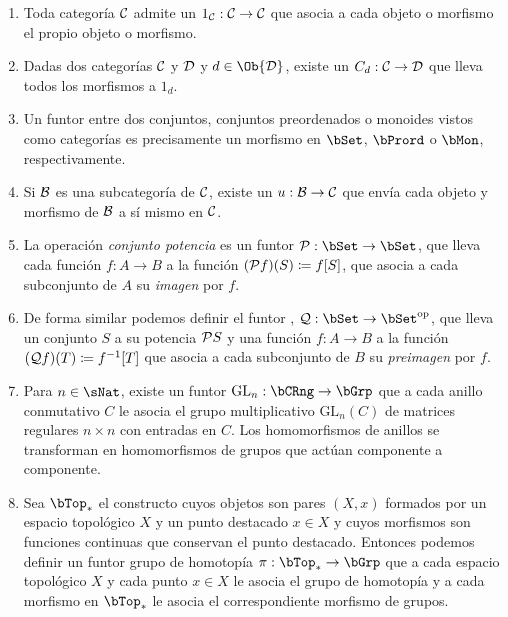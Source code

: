 \begin{example}\label{ex:functors}\;
  \begin{enumerate}
  \item Toda categoría $\mathcal{C}$ admite un  $1_{\mathcal{C}}:\mathcal{C}\to\mathcal{C}$
    que asocia a cada objeto o morfismo el propio objeto o morfismo.
  \item Dadas dos categorías $\mathcal{C}$ y $\mathcal{D}$ y $d\in\Ob{\cD}$, existe un
     $C_d:\mathcal{C}\to\mathcal{D}$ que lleva todos los morfismos a $1_d$.
  \item Un funtor entre dos conjuntos, conjuntos preordenados o monoides vistos
    como categorías es precisamente un morfismo en $\bSet$, $\bPrord$ o $\bMon$,
    respectivamente.
  \item Si $\mathcal{B}$ es una subcategoría de $\mathcal{C}$, existe un 
    $u:\mathcal{B}\to\mathcal{C}$ que envía cada objeto y morfismo de $\mathcal{B}$ a sí mismo en $\mathcal{C}$.
  \item \label{enu:funct-power} La operación \emph{conjunto potencia} es un
    funtor $\power:\bSet\to\bSet$, que lleva cada función $f:A\to B$ a la
    función $(\mathcal{P} f)(S)\coloneqq f[S]$, que asocia a cada subconjunto de $A$
    su \emph{imagen} por $f$.
  \item \label{enu:funct-copower} De forma similar podemos definir el
    funtor ,
    $\copower:\bSet\to\dual{\bSet}$, que lleva un conjunto $S$ a su
    potencia $\mathcal{P}{S}$ y una función $f:A\to B$ a la función
    $(\mathcal{Q} f)(T)\coloneqq f^{-1}[T]$ que asocia a cada subconjunto
    de $B$ su \emph{preimagen} por $f$.
  \item Para $n\in\sNat$, existe un funtor $\text{GL}_n:\bCRng\to\bGrp$ que a
    cada anillo conmutativo $C$ le asocia el grupo multiplicativo
    $\text{GL}_n(C)$ de matrices regulares $n\times n$ con entradas en $C$. Los
    homomorfismos de anillos se transforman en homomorfismos de grupos que
    actúan componente a componente.
  \item Sea $\bTop_*$ el constructo cuyos objetos son pares $(X,x)$ formados por
    un espacio topológico $X$ y un punto destacado $x\in X$ y cuyos morfismos
    son funciones continuas que conservan el punto destacado. Entonces podemos
    definir un funtor grupo de homotopía $\pi:\bTop_*\to\bGrp$ que a cada
    espacio topológico $X$ y cada punto $x\in X$ le asocia el grupo de homotopía
    y a cada morfismo en $\bTop_*$ le asocia el correspondiente morfismo de
    grupos.\cite[p. 13]{maclane}


\end{enumerate}
\end{example}
